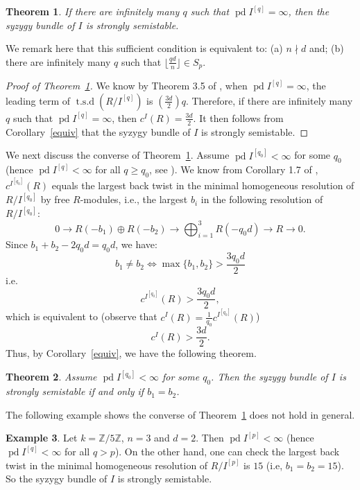 \documentclass[draft]{amsart}
\newtheorem{theorem}{Theorem}[section]
\theoremstyle{definition}
\newtheorem{example}[theorem]{Example}
\numberwithin{equation}{theorem}
\begin{document}
\begin{theorem}\label{fpd}
If there are infinitely many $q$ such that ${\mathop{\mathrm{pd}}\nolimits} I^{[q]} = {{\infty}}$, then the syzygy bundle of $I$ is strongly semistable.
\end{theorem} 

\noindent We remark here that this sufficient condition is equivalent to: (a) $n \nmid d$ and; (b)  there are infinitely many $q$ such that ${{\lfloor}}\frac{qd}{n} {{\rfloor}}\in S_p $.

\begin{proof}[Proof of Theorem~\ref{fpd}]
We know by Theorem 3.5 of \cite{KRV}, when ${\mathop{\mathrm{pd}}\nolimits} I^{[q]} = {{\infty}}$, the leading term of ${\operatorname{t.s.d}} (R/I^{[q]})$ is $(\frac{3d}{2})q$. Therefore, if there are infinitely many $q$ such that ${\mathop{\mathrm{pd}}\nolimits} I^{[q]} = {{\infty}}$, then $c^I(R)=\frac{3d}{2}$. It then follows from Corollary~\ref{equiv} that the syzygy bundle of $I$ is strongly semistable.
\end{proof}

We next discuss the converse of Theorem~\ref{fpd}. Assume ${\mathop{\mathrm{pd}}\nolimits} I^{[q_0]} < {{\infty}}$ for some $q_0$ (hence ${\mathop{\mathrm{pd}}\nolimits} I^{[q]} < {{\infty}}$ for all $q \geq q_0$, see \cite{PS}). We know from Corollary 1.7 of \cite{KV}, $c^{I^{[q_0]}}(R)$ equals the largest back twist in the minimal homogeneous resolution of $R/I^{[q_0]}$  by free $R$-modules, i.e., the largest $b_i$ in the following resolution of $R/I^{[q_0]}$:
\[0 \to R(-b_1)\oplus R(-b_2) \to \bigoplus_{i=1}^3 R(-q_0d) \to R \to 0.\]
Since $b_1+b_2-2q_0d=q_0d$, we have:
$$b_1 \neq b_2\Leftrightarrow \max\{b_1, b_2\} >\frac{3q_0d}{2}$$
i.e.
\[c^{I^{[q_0]}}(R)>\frac{3q_0d}{2},\] 
which is equivalent to (observe that $c^I( R)=\frac{1}{q_0}c^{I^{[q_0]}} (R)$)
$$c^I( R)>\frac{3d}{2}.$$
Thus, by Corollary~\ref{equiv}, we have the following theorem.
\begin{theorem}\label{twist}
Assume ${\mathop{\mathrm{pd}}\nolimits} I^{[q_0]} < {{\infty}}$ for some $q_0$. Then the syzygy bundle of $I$ is strongly semistable if and only if $b_1=b_2$.
\end{theorem}

\noindent The following example shows the converse of Theorem~\ref{fpd} does not hold in general. 

\begin{example}
Let $k={\mathbb Z}/5{\mathbb Z}$, $n=3$ and $d=2$. Then ${\mathop{\mathrm{pd}}\nolimits} I^{[p]} < {{\infty}}$ (hence ${\mathop{\mathrm{pd}}\nolimits} I^{[q]} < {{\infty}}$ for all $q>p$). On the other hand, one can check the largest back twist in the minimal homogeneous resolution of $R/I^{[p]}$ is $15$ (i.e, $b_1=b_2=15$). So the syzygy bundle of $I$ is strongly semistable.
\end{example}
\end{document}
